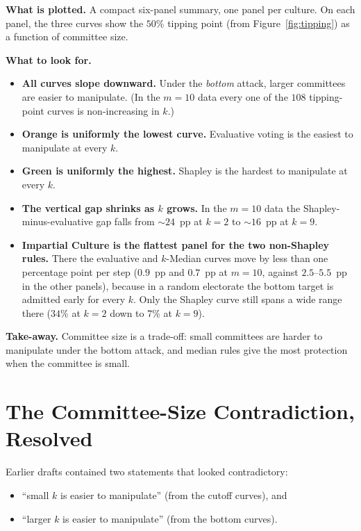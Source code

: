 \documentclass[11pt,a4paper]{article}
\begin{document}
\textbf{What is plotted.} A compact six-panel summary, one panel per culture.
On each panel, the three curves show the \(50\%\) tipping point (from
Figure~\ref{fig:tipping}) as a function of committee size.

\textbf{What to look for.}
\begin{itemize}
  \item \textbf{All curves slope downward.} Under the \emph{bottom} attack,
        larger committees are easier to manipulate. (In the \(m = 10\) data
        every one of the \(108\) tipping-point curves is non-increasing in
        \(k\).)
  \item \textbf{Orange is uniformly the lowest curve.} Evaluative voting is
        the easiest to manipulate at every \(k\).
  \item \textbf{Green is uniformly the highest.} Shapley is the hardest to
        manipulate at every \(k\).
  \item \textbf{The vertical gap shrinks as \(k\) grows.} In the \(m = 10\)
        data the Shapley-minus-evaluative gap falls from \(\sim24\)~pp at
        \(k = 2\) to \(\sim16\)~pp at \(k = 9\).
  \item \textbf{Impartial Culture is the flattest panel for the two
        non-Shapley rules.} There the evaluative and \(k\)-Median curves move
        by less than one percentage point per step (\(0.9\)~pp and \(0.7\)~pp
        at \(m = 10\), against \(2.5\)--\(5.5\)~pp in the other panels),
        because in a random electorate the bottom target is admitted early
        for every \(k\). Only the Shapley curve still spans a wide range
        there (\(34\%\) at \(k = 2\) down to \(7\%\) at \(k = 9\)).
\end{itemize}

\textbf{Take-away.} Committee size is a trade-off: small committees are
harder to manipulate under the bottom attack, and median rules give the most
protection when the committee is small.

\section{The Committee-Size Contradiction, Resolved}
\label{sec:contradiction}

Earlier drafts contained two statements that looked contradictory:

\begin{itemize}
  \item ``small \(k\) is easier to manipulate'' (from the cutoff curves), and
  \item ``larger \(k\) is easier to manipulate'' (from the bottom curves).
\end{itemize}
\end{document}

